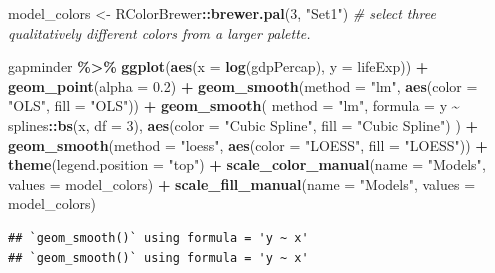 \documentclass[
]{book}
\newenvironment{Shaded}{\begin{snugshade}}{\end{snugshade}}
\newcommand{\AttributeTok}[1]{\textcolor[rgb]{0.13,0.29,0.53}{#1}}
\newcommand{\CommentTok}[1]{\textcolor[rgb]{0.56,0.35,0.01}{\textit{#1}}}
\newcommand{\DecValTok}[1]{\textcolor[rgb]{0.00,0.00,0.81}{#1}}
\newcommand{\FloatTok}[1]{\textcolor[rgb]{0.00,0.00,0.81}{#1}}
\newcommand{\FunctionTok}[1]{\textcolor[rgb]{0.13,0.29,0.53}{\textbf{#1}}}
\newcommand{\NormalTok}[1]{#1}
\newcommand{\OtherTok}[1]{\textcolor[rgb]{0.56,0.35,0.01}{#1}}
\newcommand{\SpecialCharTok}[1]{\textcolor[rgb]{0.81,0.36,0.00}{\textbf{#1}}}
\newcommand{\StringTok}[1]{\textcolor[rgb]{0.31,0.60,0.02}{#1}}
\begin{document}
\begin{Shaded}
\begin{Highlighting}[]
\NormalTok{model\_colors }\OtherTok{\textless{}{-}}\NormalTok{ RColorBrewer}\SpecialCharTok{::}\FunctionTok{brewer.pal}\NormalTok{(}\DecValTok{3}\NormalTok{, }\StringTok{"Set1"}\NormalTok{) }\CommentTok{\# select three qualitatively different colors from a larger palette.}

\NormalTok{gapminder }\SpecialCharTok{\%\textgreater{}\%}
  \FunctionTok{ggplot}\NormalTok{(}\FunctionTok{aes}\NormalTok{(}\AttributeTok{x =} \FunctionTok{log}\NormalTok{(gdpPercap), }\AttributeTok{y =}\NormalTok{ lifeExp)) }\SpecialCharTok{+}
  \FunctionTok{geom\_point}\NormalTok{(}\AttributeTok{alpha =} \FloatTok{0.2}\NormalTok{) }\SpecialCharTok{+}
  \FunctionTok{geom\_smooth}\NormalTok{(}\AttributeTok{method =} \StringTok{"lm"}\NormalTok{, }\FunctionTok{aes}\NormalTok{(}\AttributeTok{color =} \StringTok{"OLS"}\NormalTok{, }\AttributeTok{fill =} \StringTok{"OLS"}\NormalTok{)) }\SpecialCharTok{+}
  \FunctionTok{geom\_smooth}\NormalTok{(}
    \AttributeTok{method =} \StringTok{"lm"}\NormalTok{, }\AttributeTok{formula =}\NormalTok{ y }\SpecialCharTok{\textasciitilde{}}\NormalTok{ splines}\SpecialCharTok{::}\FunctionTok{bs}\NormalTok{(x, }\AttributeTok{df =} \DecValTok{3}\NormalTok{),}
    \FunctionTok{aes}\NormalTok{(}\AttributeTok{color =} \StringTok{"Cubic Spline"}\NormalTok{, }\AttributeTok{fill =} \StringTok{"Cubic Spline"}\NormalTok{)}
\NormalTok{  ) }\SpecialCharTok{+}
  \FunctionTok{geom\_smooth}\NormalTok{(}\AttributeTok{method =} \StringTok{"loess"}\NormalTok{, }\FunctionTok{aes}\NormalTok{(}\AttributeTok{color =} \StringTok{"LOESS"}\NormalTok{, }\AttributeTok{fill =} \StringTok{"LOESS"}\NormalTok{)) }\SpecialCharTok{+}
  \FunctionTok{theme}\NormalTok{(}\AttributeTok{legend.position =} \StringTok{"top"}\NormalTok{) }\SpecialCharTok{+}
  \FunctionTok{scale\_color\_manual}\NormalTok{(}\AttributeTok{name =} \StringTok{"Models"}\NormalTok{, }\AttributeTok{values =}\NormalTok{ model\_colors) }\SpecialCharTok{+}
  \FunctionTok{scale\_fill\_manual}\NormalTok{(}\AttributeTok{name =} \StringTok{"Models"}\NormalTok{, }\AttributeTok{values =}\NormalTok{ model\_colors)}
\end{Highlighting}
\end{Shaded}

\begin{verbatim}
## `geom_smooth()` using formula = 'y ~ x'
## `geom_smooth()` using formula = 'y ~ x'
\end{verbatim}
\end{document}
